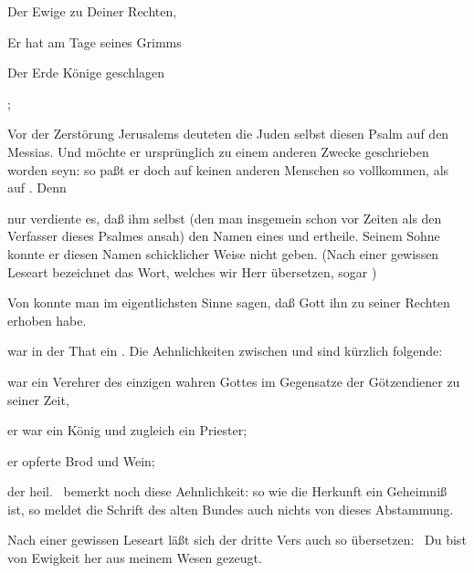 \begin{aufza}
{\par
\begin{aufzb}\item[]
\par
\end{aufzb}\par
Der Ewige zu Deiner Rechten,\par
\begin{aufzb}\item[]
Er hat am Tage seines Grimms\par
\end{aufzb}\par
Der Erde Könige geschlagen}; \usw 
\end{aufza}\par

Vor der Zerstörung Jerusalems deuteten die Juden selbst diesen Psalm auf den Messias. Und möchte er ursprünglich zu einem anderen Zwecke geschrieben worden seyn: so paßt er doch auf keinen anderen Menschen so vollkommen, als auf . Denn
\begin{aufzb}
\item nur  verdiente es, daß ihm selbst  (den man insgemein schon vor  Zeiten als den Verfasser dieses Psalmes ansah) den Namen eines  und  ertheile. Seinem Sohne  konnte er diesen Namen schicklicher Weise nicht geben. (Nach einer gewissen Leseart bezeichnet das Wort, welches wir Herr übersetzen, sogar )
\item Von  konnte man im eigentlichsten Sinne sagen, daß Gott ihn zu seiner Rechten erhoben habe.
\item {} war in der That ein . Die Aehnlichkeiten zwischen  und  sind kürzlich folgende:
\begin{aufzc}
\item {} war ein Verehrer des einzigen wahren Gottes im Gegensatze der Götzendiener zu seiner Zeit,
\item er war ein König und zugleich ein Priester;
\item er opferte Brod und Wein;
\item der heil.\  bemerkt noch diese Aehnlichkeit: so wie die Herkunft  ein Geheimniß ist, so meldet die Schrift des alten Bundes auch nichts von dieses  Abstammung.
\end{aufzc}
\item Nach einer gewissen Leseart läßt sich der dritte Vers auch so übersetzen:  \dh\ Du bist von Ewigkeit her aus meinem Wesen gezeugt.~
\end{aufzb}



